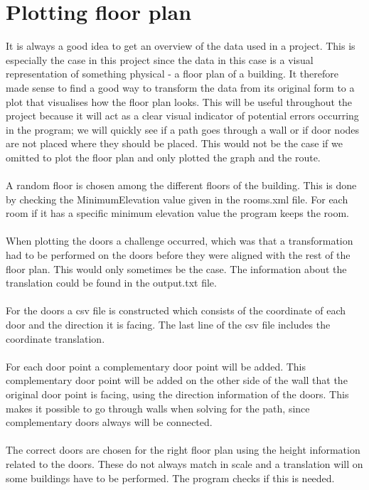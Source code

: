 \section{Plotting floor plan}
It is always a good idea to get an overview of the data used in a project. This is especially the case in this project since the data in this case is a visual representation of something physical - a floor plan of a building. It therefore made sense to find a good way to transform the data from its original form to a plot that visualises how the floor plan looks. This will be useful throughout the project because it will act as a clear visual indicator of potential errors occurring in the program; we will quickly see if a path goes through a wall or if door nodes are not placed where they should be placed. This would not be the case if we omitted to plot the floor plan and only plotted the graph and the route.
\\\\
A random floor is chosen among the different floors of the building. This is done by checking the MinimumElevation value given in the rooms.xml file. For each room if it has a specific minimum elevation value the program keeps the room. 
\\\\
When plotting the doors a challenge occurred, which was that a transformation had to be performed on the doors before they were aligned with the rest of the floor plan. This would only sometimes be the case. The information about the translation could be found in the output.txt file.
\\\\
For the doors a csv file is constructed which consists of the coordinate of each door and the direction it is facing. The last line of the csv file includes the coordinate translation.
\\\\
For each door point a complementary door point will be added. This complementary door point will be  added on the other side of the wall that the original door point is facing, using the direction information of the doors. This makes it possible to go through walls when solving for the path, since complementary doors always will be connected.
\\\\
The correct doors are chosen for the right floor plan using the height information related to the doors. These do not always match in scale and a translation will on some buildings have to be performed. The program checks if this is needed.

